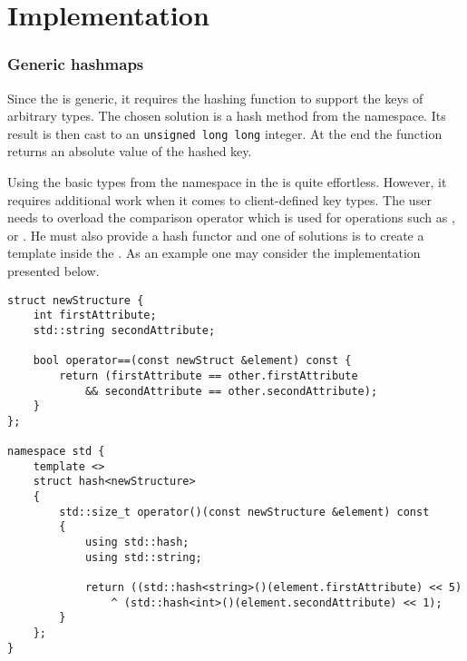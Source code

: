 
\section{Implementation}

    \subsubsection{Generic hashmaps} %
        
        Since the \NvmHashMap is generic, it requires the hashing function to support the keys of arbitrary types.
        The chosen solution is a hash method from the \std namespace. 
        Its result is then cast to an \texttt{unsigned long long} integer.
        At the end the function returns an absolute value of the hashed key.
        
        Using the basic types from the \std namespace in the \NvmHashMap is quite effortless.
        However, it requires additional work when it comes to client-defined key types.
        The user needs to overload the comparison operator which is used for operations such as \insertMethod, \getMethod or \removeMethod.
        He must also provide a hash functor and one of solutions is to create a template inside the \std. 
        As an example one may consider the implementation presented below.
            
\begin{lstlisting}[caption={User-defined key usage in the \NvmHashMap}]
struct newStructure {
    int firstAttribute;
    std::string secondAttribute;
    
    bool operator==(const newStruct &element) const {
        return (firstAttribute == other.firstAttribute 
            && secondAttribute == other.secondAttribute);
    }
};

namespace std {
    template <>
    struct hash<newStructure>
    {
        std::size_t operator()(const newStructure &element) const
        {
            using std::hash;
            using std::string;

            return ((std::hash<string>()(element.firstAttribute) << 5)
                ^ (std::hash<int>()(element.secondAttribute) << 1);
        }
    };
}
\end{lstlisting}

